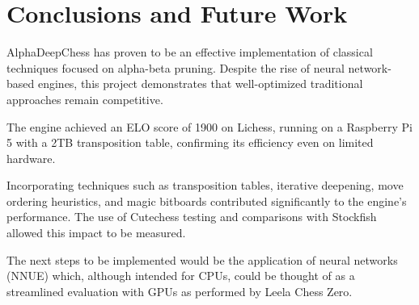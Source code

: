 \chapter{Conclusions and Future Work}
\label{cap:conclusiones}

AlphaDeepChess has proven to be an effective implementation of classical techniques focused on alpha-beta pruning. Despite the rise of neural network-based engines, this project demonstrates that well-optimized traditional approaches remain competitive.

\vspace{1em}

\noindent The engine achieved an ELO score of 1900 on Lichess, running on a Raspberry Pi 5 with a 2TB transposition table, confirming its efficiency even on limited hardware.

\vspace{1em}

\noindent Incorporating techniques such as transposition tables, iterative deepening, move ordering heuristics, and magic bitboards contributed significantly to the engine's performance. The use of Cutechess testing and comparisons with Stockfish allowed this impact to be measured.

\vspace{1em}

\noindent The next steps to be implemented would be the application of neural networks (NNUE) which, although intended for CPUs, could be thought of as a streamlined evaluation with GPUs as performed by Leela Chess Zero.
